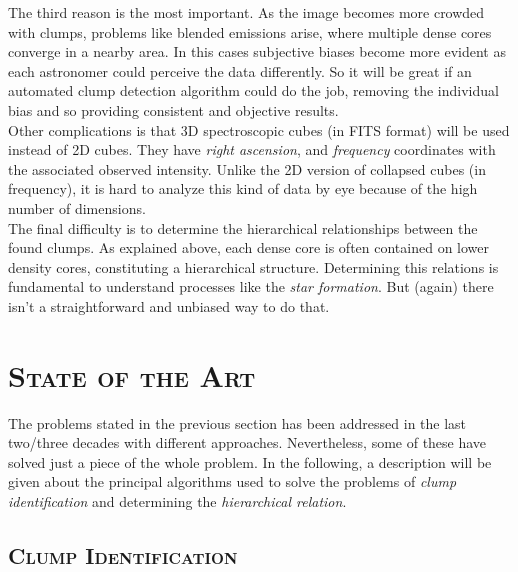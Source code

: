 \documentclass[letter, 11pt]{article}
\begin{document}
The third reason is the most important. As the image becomes more crowded with clumps, problems like blended emissions arise, where multiple dense cores converge in a nearby area. In this cases subjective biases become more evident as each astronomer could perceive the data differently. So it will be great if an automated clump detection algorithm could do the job, removing the individual bias and so providing consistent and objective results.\\

Other complications is that 3D spectroscopic cubes (in FITS format) will be used instead of 2D cubes. They have \textit{right ascension},  and \textit{frequency} coordinates with the associated observed intensity. Unlike the 2D version of collapsed cubes (in frequency), it is hard to analyze this kind of data by eye because of the high number of dimensions.\\

The final difficulty is to determine the hierarchical relationships between the found clumps. As explained above, each dense core is often contained on lower density cores, constituting a hierarchical structure. Determining this relations is fundamental to understand processes like the \textit{star formation}. But (again) there isn't a straightforward and unbiased way to do that.

    




\section{\textsc{State of the Art}}

The problems stated in the previous section has been addressed in the last two/three decades with different approaches. Nevertheless, some of these have solved just a piece of the whole problem. In the following, a description will be given about the principal algorithms used to solve the problems of \textit{clump identification} and determining the \textit{hierarchical relation}.

\subsection{\textsc{Clump Identification}}
\end{document}
